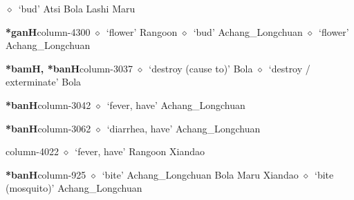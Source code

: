 \hspace{1ex}
         $\diamond$~`bud'
         Atsi 
\hspace{1ex}
         Bola 
\hspace{1ex}
         Lashi 
\hspace{1ex}
         Maru 
  \item {\footnotesize \textbf{*ganH}}{\tiny column-4300}
         $\diamond$~`flower'
         Rangoon 
\hspace{1ex}
         $\diamond$~`bud'
         Achang\_Longchuan 
\hspace{1ex}
         $\diamond$~`flower'
         Achang\_Longchuan 
  \item {\footnotesize \textbf{*bamH, *banH}}{\tiny column-3037}
         $\diamond$~`destroy (cause to)'
         Bola 
\hspace{1ex}
         $\diamond$~`destroy / exterminate'
         Bola 
  \item {\footnotesize \textbf{*banH}}{\tiny column-3042}
         $\diamond$~`fever, have'
         Achang\_Longchuan 
  \item {\footnotesize \textbf{*banH}}{\tiny column-3062}
         $\diamond$~`diarrhea, have'
         Achang\_Longchuan 
  \item {\footnotesize \textbf{}}{\tiny column-4022}
         $\diamond$~`fever, have'
         Rangoon 
\hspace{1ex}
         Xiandao 
  \item {\footnotesize \textbf{*banH}}{\tiny column-925}
         $\diamond$~`bite'
         Achang\_Longchuan 
\hspace{1ex}
         Bola 
\hspace{1ex}
         Maru 
\hspace{1ex}
         Xiandao 
\hspace{1ex}
         $\diamond$~`bite (mosquito)'
         Achang\_Longchuan 
